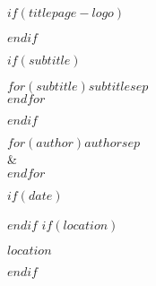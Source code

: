 \begin{titlepage}
\makeatletter
$if(titlepage-logo)$
\begin{center}

\end{center}
$endif$
\vspace{1cm}
\begin{center}
\Huge \textbf{\@title}
\end{center}
$if(subtitle)$
\begin{center}
\LARGE $for(subtitle)$$subtitle$$sep$\\ $endfor$
\end{center}
$endif$
\vspace{1cm}
\begin{center}
$for(author)$\textbf{$author$}$sep$ \\ \& \\ $endfor$
\end{center}
$if(date)$
\begin{center}
\@date
\end{center}
$endif$
$if(location)$
\begin{center}
\vfill
$location$
\vspace{1cm}
\end{center}
$endif$
\makeatother
\end{titlepage}
